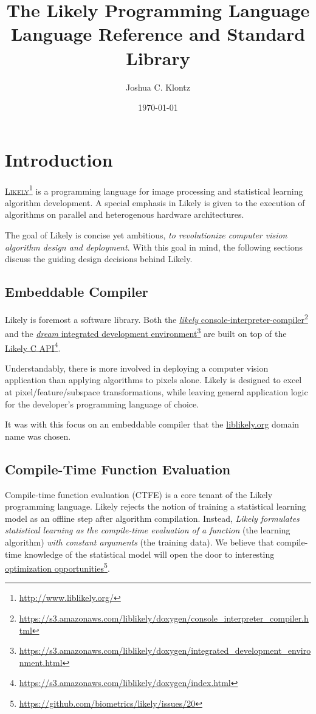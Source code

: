 \documentclass[twoside=false, numbers=noenddot]{scrbook}
\title{The Likely Programming Language \\
       {\large Language Reference and Standard Library}}
\author{Joshua C. Klontz}
\date{\today}
\newcommand{\noun}[1]{\textsc{#1}}
\newcommand{\fref}[2]{\href{#1}{#2}\footnote{\href{#1}{#1}}}
\newcommand{\doxygenurl}{https://s3.amazonaws.com/liblikely/doxygen/}
\newcommand{\githuburl}{https://github.com/biometrics/likely/}
\begin{document}
\maketitle
\tableofcontents

\chapter{Introduction}
\fref{http://www.liblikely.org/}{\noun{Likely}} is a programming language for image processing and statistical learning algorithm development.
A special emphasis in Likely is given to the execution of algorithms on parallel and heterogenous hardware architectures.

The goal of Likely is concise yet ambitious, \emph{to revolutionize computer vision algorithm design and deployment}.
With this goal in mind, the following sections discuss the guiding design decisions behind Likely.

\section{Embeddable Compiler}
Likely is foremost a software library.
Both the \fref{\doxygenurl console\_interpreter\_compiler.html}{\emph{likely} console-interpreter-compiler} and the \fref{\doxygenurl integrated\_development\_environment.html}{\emph{dream} integrated development environment} are built on top of the \fref{\doxygenurl index.html}{Likely C API}.

Understandably, there is more involved in deploying a computer vision application than applying algorithms to pixels alone.
Likely is designed to excel at pixel/feature/subspace transformations, while leaving general application logic for the developer's programming language of choice.

It was with this focus on an embeddable compiler that the \url{liblikely.org} domain name was chosen.

\section{Compile-Time Function Evaluation}
Compile-time function evaluation (CTFE) is a core tenant of the Likely programming language.
Likely rejects the notion of training a statistical learning model as an offline step after algorithm compilation.
Instead, \emph{Likely formulates statistical learning as the compile-time evaluation of a function} (the learning algorithm) \emph{with constant arguments} (the training data).
We believe that compile-time knowledge of the statistical model will open the door to interesting \fref{\githuburl issues/20}{optimization opportunities}.
\end{document}
